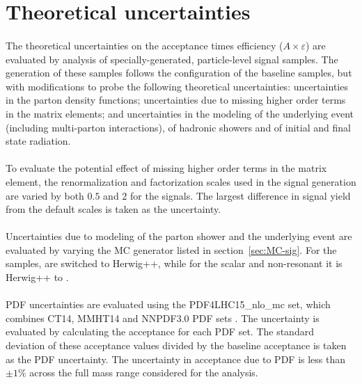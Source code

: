 \section{Theoretical uncertainties}
\label{sec:boosted-systematics-theory}
\paragraph{}
The theoretical uncertainties on the acceptance times efficiency ($A\times\varepsilon$) are evaluated by analysis of specially-generated, particle-level signal samples. 
The generation of these samples follows the configuration of the baseline samples, but with modifications to probe the following theoretical uncertainties: uncertainties in the parton density functions; uncertainties due to missing higher order terms in the matrix elements; and uncertainties in the modeling of the underlying event (including multi-parton interactions), of hadronic showers and of initial and final state radiation.

\paragraph{}
To evaluate the potential effect of missing higher order terms in the matrix element, the renormalization and factorization scales used in the signal generation are varied by both $0.5$ and $2$ for the signals.
The largest difference in signal yield from the default scales is taken as the uncertainty.

\paragraph{}
Uncertainties due to modeling of the parton shower and the underlying event are evaluated by varying the MC generator listed in section~\ref{sec:MC-sig}. 
For the \Grav~ samples,  are switched to Herwig++, while for the scalar and non-resonant it is Herwig++ to .

\paragraph{}
PDF uncertainties are evaluated using the PDF4LHC15\_nlo\_mc set, which combines CT14, MMHT14 and NNPDF3.0 PDF sets \cite{0954-3899-43-2-023001}. 
The uncertainty is evaluated by calculating the acceptance for each PDF set. 
The standard deviation of these acceptance values divided by the baseline acceptance is taken as the PDF uncertainty.
The uncertainty in acceptance due to PDF is less than $\pm1\%$ across the full mass range considered for the analysis.

